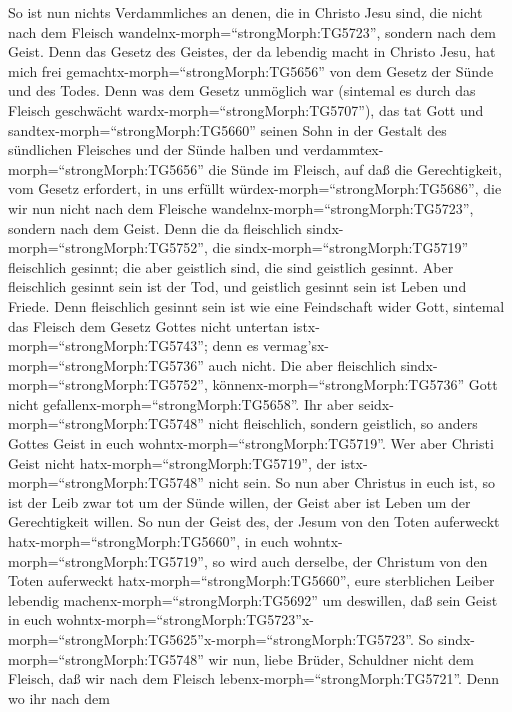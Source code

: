  So ist nun nichts Verdammliches an denen, die in Christo
Jesu sind, die nicht nach dem Fleisch
wandelnx-morph=``strongMorph:TG5723'', sondern nach dem Geist.
 Denn das Gesetz des Geistes, der da lebendig macht in
Christo Jesu, hat mich frei gemachtx-morph=``strongMorph:TG5656'' von
dem Gesetz der Sünde und des Todes.  Denn was dem Gesetz
unmöglich war (sintemal es durch das Fleisch geschwächt
wardx-morph=``strongMorph:TG5707''), das tat Gott und
sandtex-morph=``strongMorph:TG5660'' seinen Sohn in der Gestalt des
sündlichen Fleisches und der Sünde halben und
verdammtex-morph=``strongMorph:TG5656'' die Sünde im Fleisch,
 auf daß die Gerechtigkeit, vom Gesetz erfordert, in uns
erfüllt würdex-morph=``strongMorph:TG5686'', die wir nun nicht nach dem
Fleische wandelnx-morph=``strongMorph:TG5723'', sondern nach dem Geist.
 Denn die da fleischlich sindx-morph=``strongMorph:TG5752'',
die sindx-morph=``strongMorph:TG5719'' fleischlich gesinnt; die aber
geistlich sind, die sind geistlich gesinnt.  Aber
fleischlich gesinnt sein ist der Tod, und geistlich gesinnt sein ist
Leben und Friede.  Denn fleischlich gesinnt sein ist wie
eine Feindschaft wider Gott, sintemal das Fleisch dem Gesetz Gottes
nicht untertan istx-morph=``strongMorph:TG5743''; denn es
vermag'sx-morph=``strongMorph:TG5736'' auch nicht.  Die aber
fleischlich sindx-morph=``strongMorph:TG5752'',
könnenx-morph=``strongMorph:TG5736'' Gott nicht
gefallenx-morph=``strongMorph:TG5658''.  Ihr aber
seidx-morph=``strongMorph:TG5748'' nicht fleischlich, sondern geistlich,
so anders Gottes Geist in euch wohntx-morph=``strongMorph:TG5719''. Wer
aber Christi Geist nicht hatx-morph=``strongMorph:TG5719'', der
istx-morph=``strongMorph:TG5748'' nicht sein.  So nun aber
Christus in euch ist, so ist der Leib zwar tot um der Sünde willen, der
Geist aber ist Leben um der Gerechtigkeit willen.  So nun
der Geist des, der Jesum von den Toten auferweckt
hatx-morph=``strongMorph:TG5660'', in euch
wohntx-morph=``strongMorph:TG5719'', so wird auch derselbe, der Christum
von den Toten auferweckt hatx-morph=``strongMorph:TG5660'', eure
sterblichen Leiber lebendig machenx-morph=``strongMorph:TG5692'' um
deswillen, daß sein Geist in euch
wohntx-morph=``strongMorph:TG5723''\textbar x-morph=``strongMorph:TG5625''x-morph=``strongMorph:TG5723''.
 So sindx-morph=``strongMorph:TG5748'' wir nun, liebe
Brüder, Schuldner nicht dem Fleisch, daß wir nach dem Fleisch
lebenx-morph=``strongMorph:TG5721''.  Denn wo ihr nach dem
